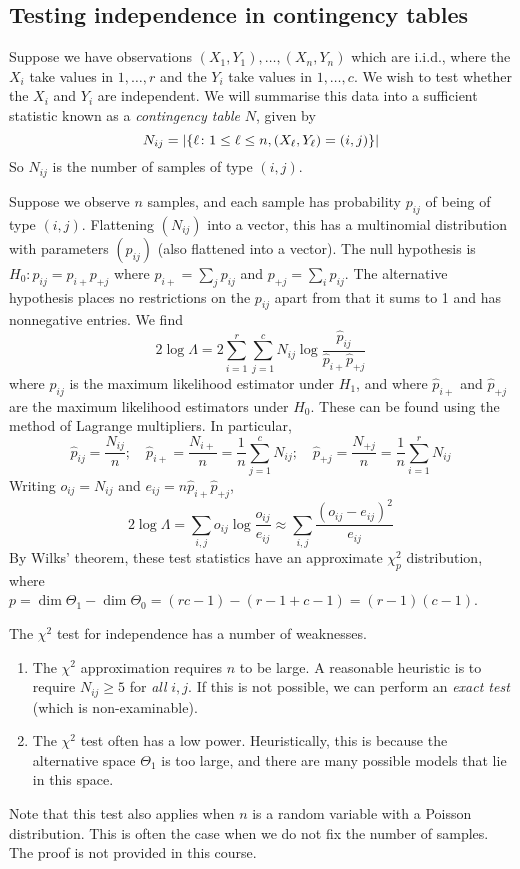 \subsection{Testing independence in contingency tables}
Suppose we have observations \( (X_1, Y_1), \dots, (X_n, Y_n) \) which are i.i.d., where the \( X_i \) take values in \( 1, \dots, r \) and the \( Y_i \) take values in \( 1, \dots, c \).
We wish to test whether the \( X_i \) and \( Y_i \) are independent.
We will summarise this data into a sufficient statistic known as a \textit{contingency table} \( N \), given by
\[
	N_{ij} = \abs{ \qty{\ell \colon 1 \leq \ell \leq n, (X_\ell, Y_\ell) = (i,j)} }
\]
So \( N_{ij} \) is the number of samples of type \( (i,j) \).
\begin{example}
	Suppose we observe \( n \) samples, and each sample has probability \( p_{ij} \) of being of type \( (i,j) \).
	Flattening \( (N_{ij}) \) into a vector, this has a multinomial distribution with parameters \( (p_{ij}) \) (also flattened into a vector).
	The null hypothesis is \( H_0 \colon p_{ij} = p_{i+} p_{+j} \) where \( p_{i+} = \sum_j p_{ij} \) and \( p_{+j} = \sum_i p_{ij} \).
	The alternative hypothesis places no restrictions on the \( p_{ij} \) apart from that it sums to 1 and has nonnegative entries.
	We find
	\[
		2 \log \Lambda = 2\sum_{i=1}^r \sum_{j=1}^c N_{ij} \log \frac{\hat p_{ij}}{\hat p_{i+} \hat p_{+j}}
	\]
	where \( \hat p_{ij} \) is the maximum likelihood estimator under \( H_1 \), and where \( \hat p_{i+} \) and \( \hat p_{+j} \) are the maximum likelihood estimators under \( H_0 \).
	These can be found using the method of Lagrange multipliers.
	In particular,
	\[
		\hat p_{ij} = \frac{N_{ij}}{n};\quad \hat p_{i+} = \frac{N_{i+}}{n} = \frac{1}{n} \sum_{j=1}^c N_{ij};\quad \hat p_{+j} = \frac{N_{+j}}{n} = \frac{1}{n} \sum_{i=1}^r N_{ij}
	\]
	Writing \( o_{ij} = N_{ij} \) and \( e_{ij} = n \hat p_{i+} \hat p_{+j} \),
	\[
		2 \log \Lambda = \sum_{i,j} o_{ij} \log \frac{o_{ij}}{e_{ij}} \approx \sum_{i,j} \frac{(o_{ij} - e_{ij})^2}{e_{ij}}
	\]
	By Wilks' theorem, these test statistics have an approximate \( \chi^2_p \) distribution, where \( p = \dim \Theta_1 - \dim \Theta_0 = (rc-1) - (r-1 + c-1) = (r-1)(c-1) \).
\end{example}
The \( \chi^2 \) test for independence has a number of weaknesses.
\begin{enumerate}
	\item The \( \chi^2 \) approximation requires \( n \) to be large.
	      A reasonable heuristic is to require \( N_{ij} \geq 5 \) for \textit{all} \( i,j \).
	      If this is not possible, we can perform an \textit{exact test} (which is non-examinable).
	\item The \( \chi^2 \) test often has a low power.
	      Heuristically, this is because the alternative space \( \Theta_1 \) is too large, and there are many possible models that lie in this space.
\end{enumerate}
Note that this test also applies when \( n \) is a random variable with a Poisson distribution.
This is often the case when we do not fix the number of samples.
The proof is not provided in this course.

